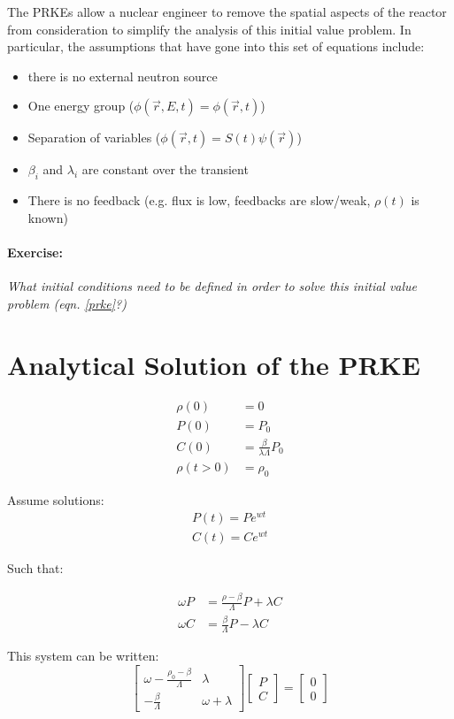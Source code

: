 \documentclass[12pt]{article}
\begin{document}
The PRKEs allow a nuclear engineer to remove the spatial aspects of the
reactor from consideration to simplify the analysis of this initial value 
problem. In particular, the assumptions that have gone into this set of 
equations include:

\begin{itemize}
\item there is no external neutron source
\item One energy group ($\phi(\vec{r},E,t) = \phi(\vec{r},t)$)
\item Separation of variables ($\phi(\vec{r},t) = S(t)\psi(\vec{r})$)
\item $\beta_i$ and $\lambda_i$ are constant over the transient
\item There is no feedback (e.g. flux is low, feedbacks are slow/weak, $\rho(t)$ is known)
\end{itemize}


\paragraph{Exercise:}
\emph{What initial conditions need to be defined in order to solve this initial 
value problem (eqn. \eqref{prke}?)}


\section{Analytical Solution of the PRKE}

\begin{align}
\rho(0) &= 0\\
P(0) &= P_0\\
C(0) &= \frac{\beta}{\lambda\Lambda}P_0\\
\rho(t>0) &= \rho_0
\end{align}

Assume solutions:
\begin{align}
P(t) = Pe^{wt}\\
C(t) = Ce^{wt}
\end{align}

Such that:

\begin{align}
\omega P &= \frac{\rho - \beta}{\Lambda} P + \lambda C\\
\omega C &= \frac{\beta}{\Lambda}P - \lambda C
\end{align}

This system can be written:
\[
\begin{bmatrix}
\omega - \frac{\rho_0-\beta}{\Lambda} & \lambda  \\
-\frac{\beta}{\Lambda} & \omega + \lambda
\end{bmatrix}
\begin{bmatrix}
P  \\
C  
\end{bmatrix}
=
\begin{bmatrix}
0  \\
0  
\end{bmatrix}
\]
\end{document}
